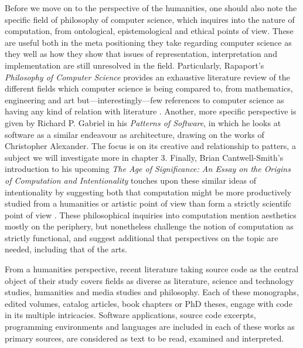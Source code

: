 Before we move on to the perspective of the humanities, one should also note the specific field of philosophy of computer science, which inquires into the nature of computation, from ontological, epistemological and ethical points of view. These are useful both in the meta positioning they take regarding computer science as they well as how they show that issues of representation, interpretation and implementation are still unresolved in the field. Particularly, Rapaport's \emph{Philosophy of Computer Science} provides an exhaustive literature review of the different fields which computer science is being compared to, from mathematics, engineering and art but—interestingly—few references to computer science as having any kind of relation with literature \citep{rapaport_philosophy_2005}. Another, more specific perspective is given by Richard P. Gabriel in his \emph{Patterns of Software}, in which he looks at software as a similar endeavour as architecture, drawing on the works of Christopher Alexander. The focus is on its creative and relationship to patters, a subject we will investigate more in chapter 3. Finally, Brian Cantwell-Smith's introduction to his upcoming \emph{The Age of Significance: An Essay on the Origins of Computation and Intentionality} touches upon these similar ideas of intentionality by suggesting both that computation might be more productively studied from a humanities or artistic point of view than form a strictly scientifc point of view \citep{smith_origin_1998}. These philosophical inquiries into computation mention aesthetics mostly on the periphery, but nonetheless challenge the notion of computation as strictly functional, and suggest additional that perspectives on the topic are needed, including that of the arts.

\vspace*{1\baselineskip}

From a humanities perspective, recent literature taking source code as the central object of their study covers fields as diverse as literature, science and technology studies, humanities and media studies and philosophy. Each of these monographs, edited volumes, catalog articles, book chapters or PhD theses, engage with code in its multiple intricacies. Software applications, source code excerpts, programming environments and languages are included in each of these works as primary sources, are considered as text to be read, examined and interpreted.


